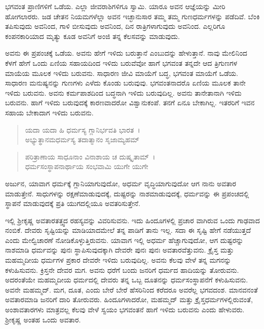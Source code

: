 ಭಗವಂತ ಪ್ರಾಣಿಗಳಿಗೆ ಒಡೆಯ. ಎಲ್ಲಾ ಜೀವರಾಶಿಗಳಿಗೂ ಸ್ವಾಮಿ. ಯಾರೂ ಅವನ ಆಜ್ಞೆಯನ್ನು ಮೀರಿ ಹೋಗಲಾರರು. ಜಡ ಚೇತನ ನಿಯಮಗಳೆಲ್ಲಾ ಅವನ ಇಚ್ಛಾನುಸಾರ ತಮ್ಮ ತಮ್ಮ ಗುಣಧರ್ಮಗಳನ್ನು ಪಡೆದಿವೆ. ಬೆಂಕಿ ತಪಿಸುವುದು ಅವನಿಂದ, ಗಾಳಿ ಬೀಸುವುದು ಅವನಿಂದ, ದಿನ ರಾತ್ರಿಗಳಾಗುವುದು ಅವನಿಂದ. ಎಲ್ಲರಿಗೂ ಕಂಪನಕಾರಿಯಾದ ಮೃತ್ಯು ಕೂಡ ಅವನಿಗೆ ಅಂಜಿ ತನ್ನ ಕೆಲಸವನ್ನು ಮಾಡುವುದು.

ಅವನು ಈ ಪ್ರಪಂಚಕ್ಕೆ ಒಡೆಯ. ಅವನು ಹೇಗೆ ಇಳಿದು ಬರುತ್ತಾನೆ ಎಂಬುದನ್ನು ಹೇಳುತ್ತಾನೆ. ನಾವು ಮೇಲಿನಿಂದ ಕೆಳಗೆ ಹೇಗೆ ಒಂದು ಏಣಿಯ ಸಹಾಯದಿಂದ ಇಳಿದು ಬರುವೆವೋ ಹಾಗೆ ಭಗವಂತ ತನ್ನದೇ ಆದ ತ್ರಿಗುಣಗಳ ಮಾಯೆಯ ಮೂಲಕ ಇಳಿದು ಬರುವನು. ಸಾಧಾರಣ ಜೀವಿ ಮಾಯೆಗೆ ಬದ್ಧ, ಭಗವಂತ ಮಾಯೆಗೆ ಒಡೆಯ. ಸಾಧಾರಣ ಮನುಷ್ಯನನ್ನು ಗುಣಗಳು ಎಳೆದು ಕೊಂಡು ಬರುವುವು. ಭಗವಂತನಾದರೊ ಏಣಿಯ ಮೂಲಕ ತಾನೇ ಇಳಿದು ಬರುವನು. ಅವನು ಕರ್ಮಪಾಶದಿಂದ ಬದ್ಧನಾಗಿ ಇಳಿದು ಬರುವುದಿಲ್ಲ. ಅವನು ತಾನೇತಾನಾಗಿ ಇಳಿದು ಬರುವನು. ಹಾಗೆ ಇಳಿದು ಬರುವುದಕ್ಕೆ ಕಾರಣವಾದರೋ ವಿಶ್ವಾನುಕಂಪೆ. ತನಗೆ ಏನೂ ಬೇಕಾಗಿಲ್ಲ. ಇತರರಿಗೆ ಇವನ ಸಹಾಯ ಬೇಕಾದಾಗ ಇಳಿದು ಬರುವನು.

\begin{verse}
ಯದಾ ಯದಾ ಹಿ ಧರ್ಮಸ್ಯ ಗ್ಲಾನಿರ್ಭವತಿ ಭಾರತ~।\\ಅಭ್ಯುತ್ಥಾನಮಧರ್ಮಸ್ಯ ತದಾತ್ಮಾನಂ ಸೃಜಾಮ್ಯಹಮ್ 
\end{verse}

\begin{verse}
ಪರಿತ್ರಾಣಾಯ ಸಾಧೂನಾಂ ವಿನಾಶಾಯ ಚ ದುಷ್ಕೃತಾಮ್~।\\ಧರ್ಮಸಂಸ್ಥಾಪನಾರ್ಥಾಯ ಸಂಭವಾಮಿ ಯುಗೇ ಯುಗೇ 
\end{verse}

{\small ಅರ್ಜುನ, ಯಾವಾಗ ಧರ್ಮಕ್ಕೆ ಗ್ಲಾನಿಯಾಗುವುದೋ, ಅಧರ್ಮ ವೃದ್ಧಿಯಾಗುವುದೋ ಆಗ ನಾನು ಅವತಾರ ಮಾಡುತ್ತೇನೆ. ಸಾಧುಗಳನ್ನು ರಕ್ಷಣೆಮಾಡುವುದಕ್ಕೆ, ದುಷ್ಟರನ್ನು ನಾಶಮಾಡುವುದಕ್ಕೆ, ಧರ್ಮವನ್ನು ಈ ಪ್ರಪಂಚದಲ್ಲಿ ಸ್ಥಾಪನೆ ಮಾಡುವುದಕ್ಕೆ ಪ್ರತಿ ಯುಗದಲ್ಲಿಯೂ ಅವತರಿಸುತ್ತೇನೆ.}

ಇಲ್ಲಿ ಶ‍್ರೀಕೃಷ್ಣ ಅವತಾರತತ್ತ್ವದ ರಹಸ್ಯವನ್ನು ವಿವರಿಸುವನು. ಇದು ಹಿಂದೂಗಳಲ್ಲಿ ಪ್ರಚಾರ ವಾಗಿರುವ ಒಂದು ಗಾಢವಾದ ನಂಬಿಕೆ. ದೇವರು ಸೃಷ್ಟಿಯನ್ನು ಮಾಡಿಯಾದಮೇಲೆ ತನ್ನ ಪಾಡಿಗೆ ತಾನು ಇಲ್ಲ. ಸದಾ ಈ ಸೃಷ್ಟಿ ಹೇಗೆ ನಡೆಯುತ್ತದೆ ಎಂದು ಮೇಲ್ವಿಚಾರಣೆ ನೋಡಿಕೊಳ್ಳುತ್ತಿರುವನು. ಯಾವಾಗ ಇಲ್ಲಿ ಅಧರ್ಮ ಹೆಚ್ಚಾಗುವುದೋ, ಆಗ ದುಷ್ಟರನ್ನು ನಾಶಮಾಡಿ ಧರ್ಮವನ್ನು ಪುನಃ ಸ್ಥಾಪಿಸುವುದಕ್ಕಾಗಿ ದೇವರೇ ಪುನಃ ಪುನಃ ಅವತಾರವೆತ್ತುವನು. ಕ್ರೈಸ್ತ ಮತ್ತು ಮಹಮ್ಮದೀಯ ಧರ್ಮಗಳ ಪ್ರಕಾರ ದೇವರೇ ಇಳಿದು ಬರುವುದಿಲ್ಲ. ಅವನು ಕೆಲವು ವೇಳೆ ತನ್ನ ಮಗನನ್ನು ಕಳುಹಿಸುವನು. ಕ್ರಿಸ್ತನೇ ದೇವರ ಮಗ. ಅವನು ಧರೆಗೆ ಬಂದು ಜನರಿಗೆ ಧರ್ಮದ ಹಾದಿಯನ್ನು ತೋರುವನು. ಅದರಂತೆಯೇ ಮಹಮ್ಮದೀಯ ಧರ್ಮದಲ್ಲಿ ದೇವರು ತನ್ನ ಒಬ್ಬ ದೂತನನ್ನು ಧರ್ಮಸಂಸ್ಥಾಪನೆಗೆ ಕಳುಹಿಸುವನು. ಅವನೇ ಮಹಮ್ಮದ್. ಮಗ, ದೂತ, ಎಂದು ಬೇರೆ ಬೇರೆ ಹೆಸರಿನಿಂದ ಕರೆದರೂ ಅವರೆಲ್ಲ ಭಗವದಂಶ. ಮಾನವನಂತೆ ಅವತಾರಮಾಡಿ ಜನರಿಗೆ ದಾರಿ ತೋರುವರು. ಹಿಂದೂಗಳಾದರೋ, ಮಹಮ್ಮದ್ ಮತ್ತು ಕ್ರೈಸ್ತಧರ್ಮಗಳಲ್ಲಿರುವಂತೆ, ಅಂಶಾವತಾರಗಳು ಮಾತ್ರವಲ್ಲ ಕೆಲವು ವೇಳೆ ಸ್ವಯಂ ಭಗವಂತನೆ ಹಾಗೆ ಇಳಿದು ಬರುವನು ಎಂದು ಹೇಳುವರು. ಶ‍್ರೀಕೃಷ್ಣ ಅಂತಹ ಒಂದು ಅವತಾರ.

